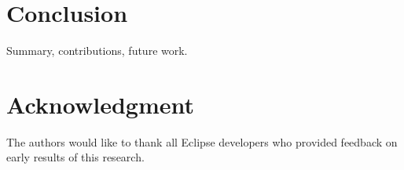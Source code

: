\section{Conclusion}

Summary, contributions, future work.

\section*{Acknowledgment}

The authors would like to thank all Eclipse developers who provided feedback on early results of this research.
